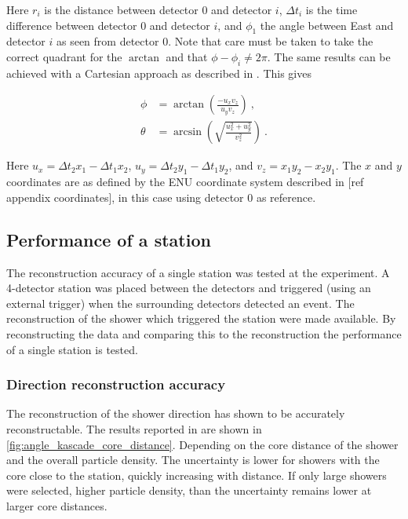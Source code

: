 Here $r_i$ is the distance between detector 0 and detector $i$, $\Delta t_i$ is the time difference between detector 0 and detector $i$, and $\phi_1$ the angle between East and detector $i$ as seen from detector 0. Note that care must be taken to take the correct quadrant for the $\arctan$ and that $\phi - \phi_i \ne 2 \pi$. The same results can be achieved with a Cartesian approach as described in \cite{montanus2015direction}. This gives

\begin{equation}
    \label{eq:direction-2dflat}
    \begin{split}
        \phi &= \arctan \left(\frac{-u_x v_z}{u_y v_z} \right) \ , \\
        \theta &= \arcsin \left(\sqrt{\frac{u_x^2+u_y^2}{v_z^2}} \right) \ .
    \end{split}
\end{equation}

Here $u_x = \Delta t_2 x_1 - \Delta t_1 x_2$, $u_y = \Delta t_2 y_1 - \Delta t_1 y_2$, and $v_z = x_1 y_2 - x_2 y_1$. The $x$ and $y$ coordinates are as defined by the ENU coordinate system described in [ref appendix coordinates], in this case using detector 0 as reference.


\subsection{Performance of a station}

The reconstruction accuracy of a single \hisparc station was tested at the \kascade experiment. A 4-detector \hisparc station was placed between the \kascade detectors and triggered (using an external trigger) when the surrounding \kascade detectors detected an event. The \kascade reconstruction of the shower which triggered the \hisparc station were made available. By reconstructing the \hisparc data and comparing this to the \kascade reconstruction the performance of a single station is tested.


\subsubsection{Direction reconstruction accuracy}

The reconstruction of the shower direction has shown to be accurately reconstructable. The results reported in \cite{fokkema2012hisparc} are shown in \cref{fig:angle_kascade_core_distance}. Depending on the core distance of the shower and the overall particle density. The uncertainty is lower for showers with the core close to the station, quickly increasing with distance. If only large showers were selected, higher particle density, than the uncertainty remains lower at larger core distances.

